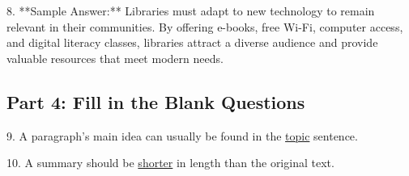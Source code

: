\documentclass[12pt]{article}
\begin{document}
8. **Sample Answer:** Libraries must adapt to new technology to remain relevant in their communities. By offering e-books, free Wi-Fi, computer access, and digital literacy classes, libraries attract a diverse audience and provide valuable resources that meet modern needs.

\subsection*{Part 4: Fill in the Blank Questions}

9. A paragraph's main idea can usually be found in the \underline{topic} sentence.

10. A summary should be \underline{shorter} in length than the original text.
\end{document}

